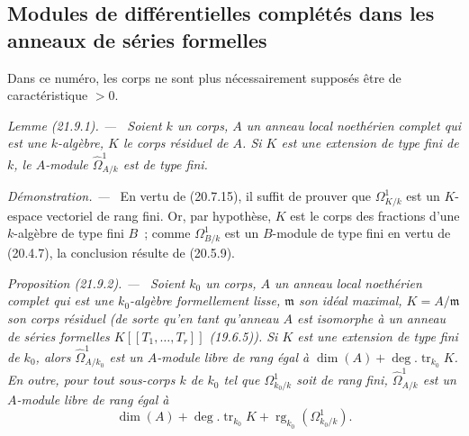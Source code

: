 \documentclass[10pt,oneside]{book}
\makeatletter
\newcommand{\setmanualcurrentlabel}[1]{\def\@currentlabel{#1}}
\newenvironment{proposition}[1][]{%
  \setmanualcurrentlabel{#1}\par\medskip\noindent\itshape Proposition (#1). ---\ }{\par}
\newenvironment{lemma}[1][]{%
  \setmanualcurrentlabel{#1}\par\medskip\noindent\itshape Lemme (#1). ---\ }{\par}
\newenvironment{proof}{%
  \par\medskip\noindent\textit{Démonstration. ---\ }}{\par}
\makeatother
\begin{document}
\subsection{Modules de différentielles complétés dans les anneaux de séries formelles}
\label{subsection:0.21.9-fr}

Dans ce numéro, les corps ne sont plus nécessairement supposés être de
caractéristique $>0$.

\begin{lemma}[21.9.1]
\label{0.21.9.1-fr}
Soient $k$ un corps, $A$ un anneau local noethérien complet qui est une
$k$-algèbre, $K$ le corps résiduel de $A$. Si $K$ est une extension de type
fini de $k$, le $A$-module $\widehat\Omega^1_{A/k}$ est de type fini.
\end{lemma}

\begin{proof}
En vertu de (20.7.15), il suffit de prouver que $\Omega^1_{K/k}$ est un
$K$-espace vectoriel de rang fini. Or, par hypothèse, $K$ est le corps des
fractions d'une $k$-algèbre de type fini $B$~; comme $\Omega^1_{B/k}$ est un
$B$-module de type fini en vertu de (20.4.7), la conclusion résulte de
(20.5.9).
\end{proof}

\begin{proposition}[21.9.2]
\label{0.21.9.2-fr}
Soient $k_0$ un corps, $A$ un anneau local noethérien complet qui est une
$k_0$-algèbre formellement lisse, $\mathfrak m$ son idéal maximal,
$K=A/\mathfrak m$ son corps résiduel (de sorte qu'en tant qu'anneau $A$ est
isomorphe à un anneau de séries formelles $K[[T_1,\ldots,T_r]]$ (19.6.5)).
Si $K$ est une extension de type fini de $k_0$, alors
$\widehat\Omega^1_{A/k_0}$ est un $A$-module libre de rang égal à
$\dim(A)+\deg.\operatorname{tr}_{k_0}K$. En outre, pour tout sous-corps $k$
de $k_0$ tel que $\Omega^1_{k_0/k}$ soit de rang fini,
$\widehat\Omega^1_{A/k}$ est un $A$-module libre de rang égal à
\[
  \dim(A)+\deg.\operatorname{tr}_{k_0}K
  +\operatorname{rg}_{k_0}(\Omega^1_{k_0/k}).
\]
\end{proposition}
\end{document}
